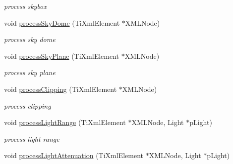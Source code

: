 \begin{DoxyCompactItemize}
\begin{DoxyCompactList}\small\item\em process skybox \end{DoxyCompactList}\item 
void \hyperlink{class_ogre_1_1_dot_scene_loader_aa22fc5272abcfc46641659f0f830d150}{process\+Sky\+Dome} (Ti\+Xml\+Element $\ast$X\+M\+L\+Node)\hypertarget{class_ogre_1_1_dot_scene_loader_aa22fc5272abcfc46641659f0f830d150}{}\label{class_ogre_1_1_dot_scene_loader_aa22fc5272abcfc46641659f0f830d150}

\begin{DoxyCompactList}\small\item\em process sky dome \end{DoxyCompactList}\item 
void \hyperlink{class_ogre_1_1_dot_scene_loader_a3021c43d60580055e58cf14ded3bee23}{process\+Sky\+Plane} (Ti\+Xml\+Element $\ast$X\+M\+L\+Node)\hypertarget{class_ogre_1_1_dot_scene_loader_a3021c43d60580055e58cf14ded3bee23}{}\label{class_ogre_1_1_dot_scene_loader_a3021c43d60580055e58cf14ded3bee23}

\begin{DoxyCompactList}\small\item\em process sky plane \end{DoxyCompactList}\item 
void \hyperlink{class_ogre_1_1_dot_scene_loader_a0d8466f519cf49e4177369b542da50be}{process\+Clipping} (Ti\+Xml\+Element $\ast$X\+M\+L\+Node)
\begin{DoxyCompactList}\small\item\em process clipping \end{DoxyCompactList}\item 
void \hyperlink{class_ogre_1_1_dot_scene_loader_a5f7e231f59db99465f289f7f31f6cb83}{process\+Light\+Range} (Ti\+Xml\+Element $\ast$X\+M\+L\+Node, Light $\ast$p\+Light)\hypertarget{class_ogre_1_1_dot_scene_loader_a5f7e231f59db99465f289f7f31f6cb83}{}\label{class_ogre_1_1_dot_scene_loader_a5f7e231f59db99465f289f7f31f6cb83}

\begin{DoxyCompactList}\small\item\em process light range \end{DoxyCompactList}\item 
void \hyperlink{class_ogre_1_1_dot_scene_loader_af02d2e6e141232809a7c0d11461a6f88}{process\+Light\+Attenuation} (Ti\+Xml\+Element $\ast$X\+M\+L\+Node, Light $\ast$p\+Light)\hypertarget{class_ogre_1_1_dot_scene_loader_af02d2e6e141232809a7c0d11461a6f88}{}\label{class_ogre_1_1_dot_scene_loader_af02d2e6e141232809a7c0d11461a6f88}


\end{DoxyCompactItemize}
